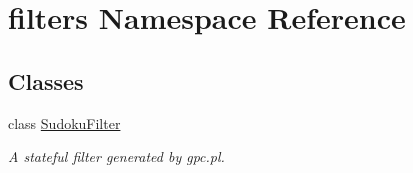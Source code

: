 \hypertarget{namespacefilters}{}\section{filters Namespace Reference}
\label{namespacefilters}
\subsection*{Classes}
\begin{DoxyCompactItemize}
\item 
class \hyperlink{classfilters_1_1SudokuFilter}{Sudoku\+Filter}
\begin{DoxyCompactList}\small\item\em A stateful filter generated by gpc.\+pl. \end{DoxyCompactList}\end{DoxyCompactItemize}
